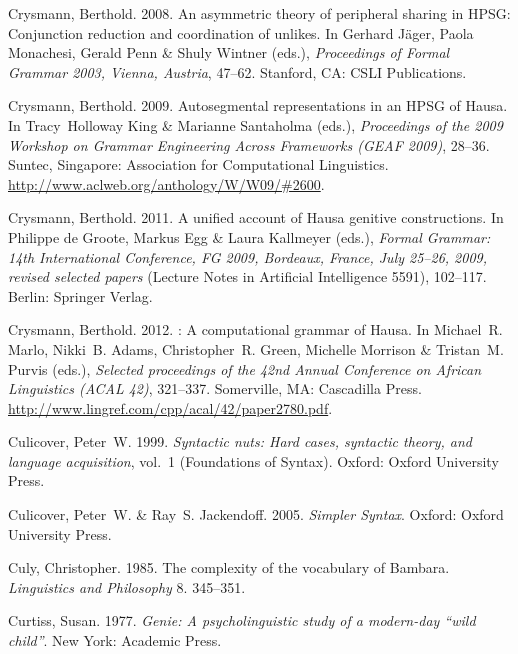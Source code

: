 \begin{thebibliography}{1420}
Crysmann, Berthold. 2008.
\newblock An asymmetric theory of peripheral sharing in {HPSG}: Conjunction
  reduction and coordination of unlikes.
\newblock In Gerhard J{\"a}ger, Paola Monachesi, Gerald Penn \& Shuly Wintner
  (eds.), \emph{Proceedings of {Formal Grammar 2003, Vienna, Austria}}, 47--62.
  Stanford, CA: CSLI Publications.

Crysmann, Berthold. 2009.
\newblock Autosegmental representations in an {HPSG} of {Hausa}.
\newblock In Tracy~Holloway King \& Marianne Santaholma (eds.),
  \emph{Proceedings of the 2009 {Workshop on Grammar Engineering Across
  Frameworks (GEAF 2009)}}, 28--36. Suntec, Singapore: Association for
  Computational Linguistics.
\newblock \urlprefix\url{http://www.aclweb.org/anthology/W/W09/#2600}.

Crysmann, Berthold. 2011.
\newblock A unified account of {Hausa} genitive constructions.
\newblock In Philippe {de Groote}, Markus Egg \& Laura Kallmeyer (eds.),
  \emph{{Formal Grammar}: {14th International Conference, FG 2009, Bordeaux,
  France, July 25--26, 2009}, revised selected papers} (Lecture Notes in
  Artificial Intelligence 5591), 102--117. Berlin: Springer Verlag.

Crysmann, Berthold. 2012.
: {A} computational grammar of {Hausa}.
\newblock In Michael~R. Marlo, Nikki~B. Adams, Christopher~R. Green, Michelle
  Morrison \& Tristan~M. Purvis (eds.), \emph{Selected proceedings of the {42nd
  Annual Conference on African Linguistics (ACAL 42)}}, 321--337. Somerville,
  MA: Cascadilla Press.
\newblock \urlprefix\url{http://www.lingref.com/cpp/acal/42/paper2780.pdf}.

Culicover, Peter~W. 1999.
\newblock \emph{Syntactic nuts: {Hard} cases, syntactic theory, and language
  acquisition}, vol.~1  (Foundations of Syntax).
\newblock Oxford: Oxford University Press.

Culicover, Peter~W. \& Ray~S. Jackendoff. 2005.
\newblock \emph{{Simpler Syntax}}.
\newblock Oxford: Oxford University Press.

Culy, Christopher. 1985.
\newblock The complexity of the vocabulary of {Bambara}.
\newblock \emph{Linguistics and Philosophy} 8. 345--351.

Curtiss, Susan. 1977.
\newblock \emph{Genie: {A} psycholinguistic study of a modern-day ``wild
  child''}.
\newblock New York: Academic Press.


\end{thebibliography}
